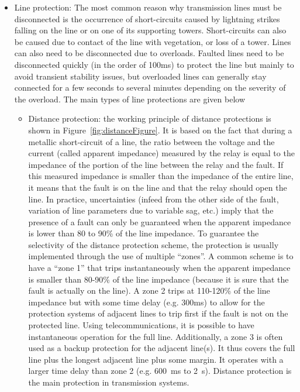 \begin{itemize}
    \item Line protection: The most common reason why transmission lines must be disconnected is the occurrence of short-circuits caused by lightning strikes falling on the line or on one of its supporting towers. Short-circuits can also be caused due to contact of the line with vegetation, or loss of a tower. Lines can also need to be disconnected due to overloads. Faulted lines need to be disconnected quickly (in the order of 100ms) to protect the line but mainly to avoid transient stability issues, but overloaded lines can generally stay connected for a few seconds to several minutes depending on the severity of the overload. The main types of line protections are given below
    \begin{itemize}
        \item Distance protection: the working principle of distance protections is shown in Figure~\ref{fig:distanceFigure}. It is based on the fact that during a metallic short-circuit of a line, the ratio between the voltage and the current (called apparent impedance) measured by the relay is equal to the impedance of the portion of the line between the relay and the fault. If this measured impedance is smaller than the impedance of the entire line, it means that the fault is on the line and that the relay should open the line. In practice, uncertainties (infeed from the other side of the fault, variation of line parameters due to variable sag, etc.) imply that the presence of a fault can only be guaranteed when the apparent impedance is lower than 80 to 90\% of the line impedance. To guarantee the selectivity of the distance protection scheme, the protection is usually implemented through the use of multiple ``zones''. A common scheme is to have a ``zone 1'' that trips instantaneously when the apparent impedance is smaller than 80-90\% of the line impedance (because it is sure that the fault is actually on the line). A zone 2 trips at 110-120\% of the line impedance but with some time delay (e.g. 300ms) to allow for the protection systems of adjacent lines to trip first if the fault is not on the protected line. Using telecommunications, it is possible to have instantaneous operation for the full line. Additionally, a zone 3 is often used as a backup protection for the adjacent line(s). It thus covers the full line plus the longest adjacent line plus some margin. It operates with a larger time delay than zone 2 (e.g. 600~ms to 2~s). Distance protection is the main protection in transmission systems.

\end{itemize}
\end{itemize}
